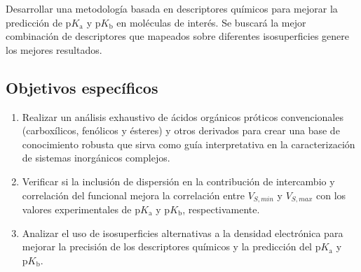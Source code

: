\documentclass[12pt]{article}
\begin{document}
	
	Desarrollar una metodolog\'{i}a  basada en descriptores qu\'{i}micos 
	para mejorar la predicci\'{o}n de $\mathrm{p}K_{\mathrm{a}}$ y $\mathrm{p}K_{\mathrm{b}}$ en mol\'{e}culas de inter\'{e}s. Se buscar\'{a} la mejor combinaci\'{o}n de descriptores que mapeados sobre diferentes isosuperficies genere los mejores resultados.
	
	
	
	\subsection{ Objetivos espec\'{i}ficos}
	\begin{enumerate}
	
		\item Realizar un an\'{a}lisis exhaustivo de \'{a}cidos org\'{a}nicos pr\'{o}ticos convencionales (carbox\'{i}licos, fen\'{o}licos y \'{e}steres) y otros derivados para crear una base de conocimiento robusta que sirva como gu\'{i}a interpretativa en la caracterizaci\'{o}n de sistemas inorg\'{a}nicos complejos.
		
		
		\item Verificar si la inclusi\'{o}n de dispersi\'{o}n en la contribuci\'{o}n de intercambio y correlaci\'{o}n del funcional mejora la correlaci\'{o}n entre  $V_{S,min}$ y $V_{S,max}$ con los valores experimentales de  $\mathrm{p}K_{\mathrm{a}}$ y $\mathrm{p}K_{\mathrm{b}}$, respectivamente.
		
		
		\item Analizar el uso de isosuperficies alternativas a la densidad electr\'{o}nica para mejorar la precisi\'{o}n de los descriptores qu\'{i}micos y la predicci\'{o}n del 
		$\mathrm{p}K_{\mathrm{a}}$ y $\mathrm{p}K_{\mathrm{b}}$.
		
		
		

\end{enumerate}
\end{document}
